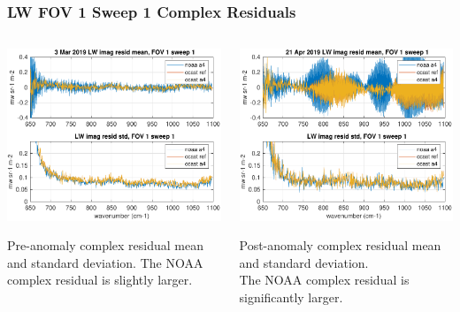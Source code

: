 \documentclass[10pt]{beamer}
\begin{document}
\begin{frame}
\frametitle{LW FOV 1 Sweep 1 Complex Residuals}
\begin{columns}[t]
\begin{column}{0.5\textwidth}
  \begin{centering}
  \includegraphics[width=\textwidth]{figures/LW_pre_fail_imag_fov1_sd1.pdf}
  \end{centering}\vspace{3mm}
  Pre-anomaly complex residual mean and standard deviation.  The NOAA complex
  residual is slightly larger.

\end{column}
\begin{column}{0.5\textwidth}  
  \begin{centering}
  \includegraphics[width=\textwidth]{figures/LW_post_fail_imag_fov1_sd1.pdf}
  \end{centering}\vspace{3mm}
  Post-anomaly complex residual mean and standard deviation.  \\The
  NOAA complex residual is significantly larger.

\end{column}
\end{columns}
\end{frame}
\end{document}
